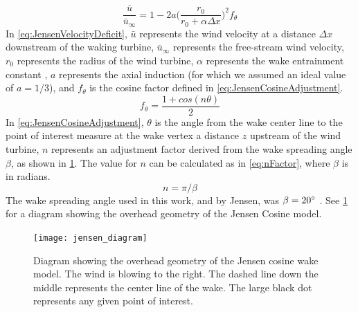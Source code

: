 \documentclass[a4paper]{jpconf}
\begin{document}
\begin{equation}
\frac{ \bar{u}}{\bar{u}_\infty} = 1 - 2a \bigg(\frac{r_0}{r_0 + \alpha \Delta x} \bigg)^2 f_\theta 
\label{eq:JensenVelocityDeficit}
\end{equation}
%
In \cref{eq:JensenVelocityDeficit}, $\bar{u}$ represents the wind velocity at a distance $\Delta x$ downstream of the waking turbine, $\bar{u}_\infty$ represents the free-stream wind velocity, $r_0$ represents the radius of the wind turbine, $\alpha$ represents the wake entrainment constant \cite{jensen1983}, $a$ represents the axial induction (for which we assumed an ideal value of $a = 1/3$), and $f_\theta$ is the cosine factor defined in \cref{eq:JensenCosineAdjustment}.
%
\begin{equation}
f_\theta = \frac{1 + cos(n\theta)}{2}
\label{eq:JensenCosineAdjustment}
\end{equation}
%
In \cref{eq:JensenCosineAdjustment},  $\theta$ is the angle from the wake center line to the point of interest measure at the wake vertex a distance $z$ upstream of the wind turbine, $n$ represents an adjustment factor derived from the wake spreading angle $\beta$, as shown in \cref{fig:JensenDiagrams}. The value for $n$ can be calculated as in \cref{eq:nFactor}, where $\beta$ is in radians.
%
\begin{equation}
n = \pi / \beta
\label{eq:nFactor}
\end{equation}
%
The wake spreading angle used in this work, and by Jensen, was $\beta = 20 \degree$  \cite{jensen1983}. See \cref{fig:JensenDiagrams} for a diagram showing the overhead geometry of the Jensen Cosine model.
%
\begin{figure}[h!]
	\centering
	\texttt{[image: jensen\_diagram]}
	\caption{Diagram showing the overhead geometry of the Jensen cosine wake model. The wind is blowing to the right. The dashed line down the middle represents the center line of the wake. The large black dot represents any given point of interest.}
	\label{fig:JensenDiagrams}
\end{figure}
\end{document}

